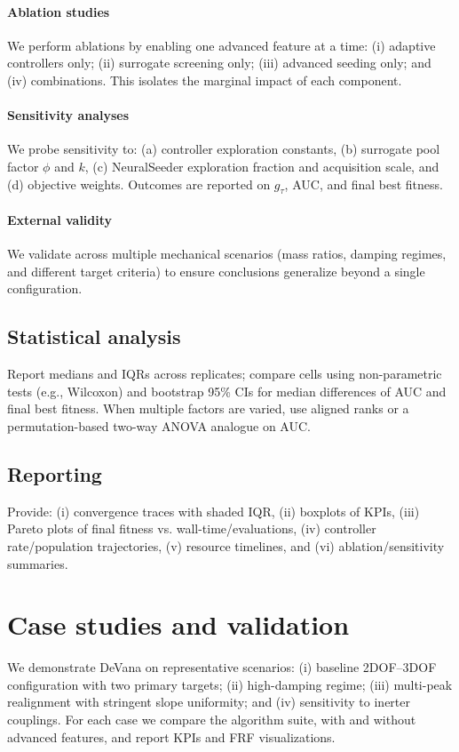 \documentclass[12pt,a4paper]{article}
\newcommand{\softwareName}{DeVana}
\begin{document}
\paragraph{Ablation studies}
We perform ablations by enabling one advanced feature at a time: (i) adaptive controllers only; (ii) surrogate screening only; (iii) advanced seeding only; and (iv) combinations. This isolates the marginal impact of each component.

\paragraph{Sensitivity analyses}
We probe sensitivity to: (a) controller exploration constants, (b) surrogate pool factor $\phi$ and $k$, (c) NeuralSeeder exploration fraction and acquisition scale, and (d) objective weights. Outcomes are reported on ${g_\tau}$, AUC, and final best fitness.

\paragraph{External validity}
We validate across multiple mechanical scenarios (mass ratios, damping regimes, and different target criteria) to ensure conclusions generalize beyond a single configuration.

\subsection{Statistical analysis}
Report medians and IQRs across replicates; compare cells using non-parametric tests (e.g., Wilcoxon) and bootstrap 95\% CIs for median differences of AUC and final best fitness. When multiple factors are varied, use aligned ranks or a permutation-based two-way ANOVA analogue on AUC.

\subsection{Reporting}
Provide: (i) convergence traces with shaded IQR, (ii) boxplots of KPIs, (iii) Pareto plots of final fitness vs. wall-time/evaluations, (iv) controller rate/population trajectories, (v) resource timelines, and (vi) ablation/sensitivity summaries.

\section{Case studies and validation}
\label{sec:case-studies}
We demonstrate \softwareName{} on representative scenarios: (i) baseline 2DOF--3DOF configuration with two primary targets; (ii) high-damping regime; (iii) multi-peak realignment with stringent slope uniformity; and (iv) sensitivity to inerter couplings. For each case we compare the algorithm suite, with and without advanced features, and report KPIs and FRF visualizations.
\end{document}
